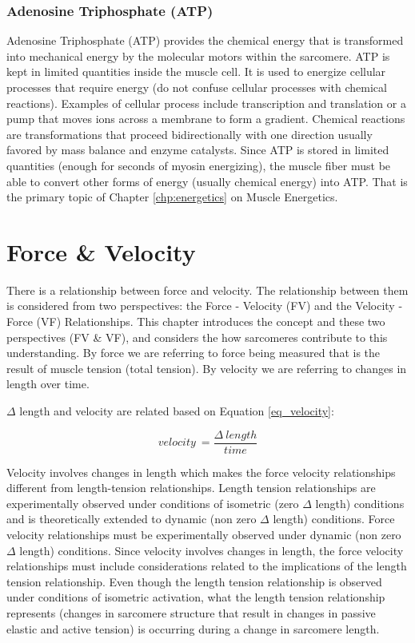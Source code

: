 \subsubsection{Adenosine Triphosphate (ATP)}
Adenosine Triphosphate (ATP) provides the chemical energy that is transformed into mechanical energy by the molecular motors within the sarcomere. ATP is kept in limited quantities inside the muscle cell. It is used to energize cellular processes that require energy (do not confuse cellular processes with chemical reactions). Examples of cellular process include transcription and translation or a pump that moves ions across a membrane to form a gradient. Chemical reactions are transformations that proceed bidirectionally with one direction usually favored by mass balance and enzyme catalysts. Since ATP is stored in limited quantities (enough for seconds of myosin energizing), the muscle fiber must be able to convert other forms of energy (usually chemical energy) into ATP. That is the primary topic of Chapter \ref{chp:energetics} on Muscle Energetics.


\section{Force \& Velocity}

There is a relationship between force and velocity. The relationship between them is considered from two perspectives: the Force - Velocity (FV) and the Velocity - Force (VF) Relationships. This chapter introduces the concept and these two perspectives (FV \& VF), and considers the how sarcomeres contribute to this understanding. By force we are referring to force being measured that is the result of muscle tension (total tension). By velocity we are referring to changes in length over time. 

\begin{flushleft}
    $\Delta$ length and velocity are related based on Equation \ref{eq_velocity}: 
\end{flushleft}

\begin{equation} \label{eq_velocity}
velocity \ = \frac{\Delta \ length}{time}
\end{equation}

Velocity involves changes in length which makes the force velocity relationships different from length-tension relationships. Length tension relationships are experimentally observed under conditions of isometric (zero $\Delta$ length) conditions and is theoretically extended to dynamic (non zero $\Delta$ length) conditions. Force velocity relationships must be experimentally observed under dynamic (non zero $\Delta$ length) conditions. Since velocity involves changes in length, the force velocity relationships must include considerations related to the implications of the length tension relationship. Even though the length tension relationship is observed under conditions of isometric activation, what the length tension relationship represents (changes in sarcomere structure that result in changes in passive elastic and active tension) is occurring during a change in sarcomere length.

